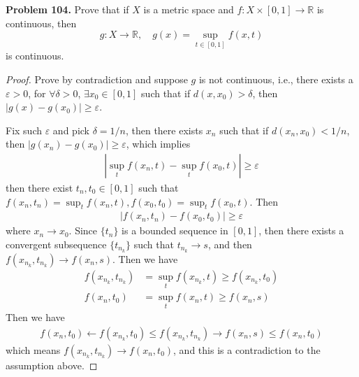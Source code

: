 \documentclass[12pt,leqno]{amsart}
\theoremstyle{definition}
\numberwithin{equation}{subsection}
\begin{document}
\medskip

\noindent
{\bf Problem 104.}
Prove that if $X$ is a metric space and $f:X\times [0,1]\to\mathbb{R}$ is continuous, then
$$
g:X\to\mathbb{R},
\quad
g(x)=\sup_{t\in [0,1]} f(x,t)
$$
is continuous.
\begin{proof}
Prove by contradiction and suppose $g$ is not continuous, i.e., there exists a $\varepsilon > 0$, for $\forall \delta > 0$, $\exists x_0 \in[0,1]$ such that if $d(x,x_0) > \delta$, then $\left|g(x) - g(x_0)\right| \geq \varepsilon$.

Fix such $\varepsilon$ and pick $\delta = 1/n$, then there exists $x_n$ such that if $d(x_n,x_0) < 1/n$, then $\left|g(x_n) - g(x_0)\right| \geq \varepsilon$, which implies 
\begin{align*}
    \left|\sup_t f(x_n,t) - \sup_t f(x_0,t)\right| \geq \varepsilon
\end{align*}
then there exist $t_n,t_0\in[0,1]$ such that $f(x_n,t_n) = \sup_t f(x_n,t), f(x_0,t_0) = \sup_t f(x_0,t)$. Then 
\begin{align*}
    \left|f(x_n,t_n) -f(x_0,t_0)\right| \geq \varepsilon
\end{align*}
where $x_n\to x_0$. Since $\{t_n\}$ is a bounded sequence in $[0,1]$, then there exists a convergent subsequence $\{t_{n_k}\}$ such that $t_{n_k}\to s$, and then $f(x_{n_k},t_{n_k})\to f(x_n,s)$. Then we have  
\begin{align*}
    f\left(x_{n_k},t_{n_k}\right) & = \sup_t f\left(x_{n_k},t \right) \geq f\left(x_{n_k},t_0\right) \\
    f(x_n,t_0) & = \sup_t f\left(x_n,t \right) \geq f(x_n,s)
\end{align*}
Then we have 
\begin{align*}
    f(x_n,t_0) \leftarrow f\left(x_{n_k},t_0\right) \leq f\left(x_{n_k},t_{n_k}\right) \rightarrow f(x_n,s) \leq f(x_n,t_0)
\end{align*}
which means $f\left(x_{n_k},t_{n_k}\right) \to f(x_n,t_0)$, and this is a contradiction to the assumption above.
\end{proof}

\medskip
\end{document}
